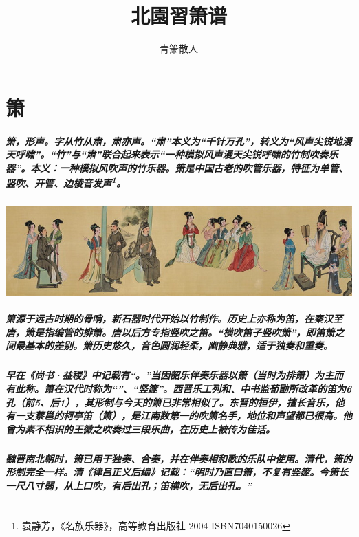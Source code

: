 \documentclass[cn,pad,twocol]{elegantbook}
\title{北園習箫谱}
\author{青箫散人}
\date{\zhtoday}
\begin{document}
\maketitle
\frontmatter
\tableofcontents
\mainmatter

\chapter{箫}
\paragraph*{箫，形声。字从竹从肃，肃亦声。“肃”本义为“千针万孔”，转义为“风声尖锐地漫天呼啸”。“竹”与“肃”联合起来表示“一种模拟风声漫天尖锐呼啸的竹制吹奏乐器”。本义：一种模拟风吹声的竹乐器。箫是中国古老的吹管乐器，特征为单管、竖吹、开管、边棱音发声\footnote{袁静芳，《名族乐器》，高等教育出版社 2004 ISBN7040150026}。}
\begin{center}
    \vfill
    \includegraphics[width=\textwidth]{cover8}
\end{center}

\paragraph*{箫源于远古时期的骨哨，新石器时代开始以竹制作。历史上亦称为笛，在秦汉至唐，箫是指编管的排箫。唐以后方专指竖吹之笛。“横吹笛子竖吹箫”，即笛箫之间最基本的差别。箫历史悠久，音色圆润轻柔，幽静典雅，适于独奏和重奏。} 
\paragraph*{早在《尚书·益稷》中记载有“。”当因韶乐伴奏乐器以箫（当时为排箫）为主而有此称。箫在汉代时称为“”、“竖篴”。西晋乐工列和、中书监荀勖所改革的笛为6 孔（前5、后1），其形制与今天的箫已非常相似了。东晋的桓伊，擅长音乐，他有一支蔡邕的柯亭笛（箫），是江南数第一的吹箫名手，地位和声望都已很高。他曾为素不相识的王徽之吹奏过三段乐曲，在历史上被传为佳话。}
\paragraph*{魏晋南北朝时，箫已用于独奏、合奏，并在伴奏相和歌的乐队中使用。清代，箫的形制完全一样。清《律吕正义后编》记载：“明时乃直曰箫，不复有竖篴。今箫长一尺八寸弱，从上口吹，有后出孔；笛横吹，无后出孔。”}
\end{document}
